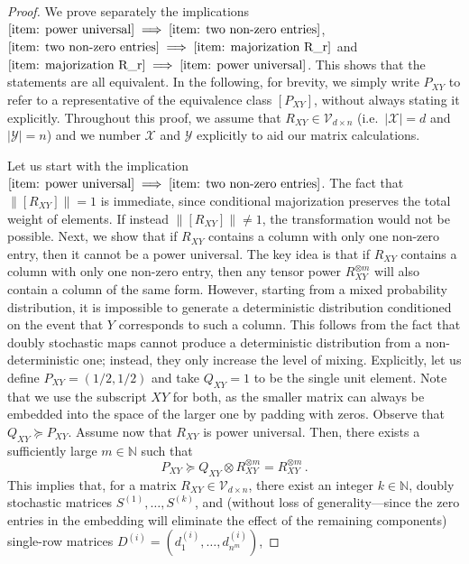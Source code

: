 \documentclass[aps,pra,11pt,onecolumn,nofootinbib,tightenlines]{revtex4-2}
\theoremstyle{definition}
\newcommand{\V}{\mathcal{V}}
\newcommand{\mc}[1]{\mathcal{#1}}
\begin{document}
\begin{proof}
We prove separately the implications $\ref{item: power universal} \implies \ref{item: two non-zero entries}$, $\ref{item: two non-zero entries} \implies \ref{item: majorization R_r}$ and $\ref{item: majorization R_r} \implies \ref{item: power universal}$. This shows that the statements are all equivalent.
In the following, for brevity, we simply write $P_{XY}$ to refer to a representative of the equivalence class $[P_{XY}]$, without always stating it explicitly. Throughout this proof, we assume that $R_{XY}\in\mc V_{d\times n}$ (i.e.\ $|\mc X|=d$ and $|\mc Y|=n$) and we number $\mc X$ and $\mc Y$ explicitly to aid our matrix calculations.

\bigskip

Let us start with the implication $\ref{item: power universal} \implies \ref{item: two non-zero entries}$. The fact that \( \|[R_{XY}]\| = 1 \) is immediate, since conditional majorization preserves the total weight of elements. If instead \( \|[R_{XY}]\| \neq 1 \), the transformation would not be possible. Next, we show that if $R_{XY}$ contains a column with only one non-zero entry, then it cannot be a power universal. The key idea is that if \( R_{XY} \) contains a column with only one non-zero entry, then any tensor power \( R_{XY}^{\otimes m} \) will also contain a column of the same form. However, starting from a mixed probability distribution, it is impossible to generate a deterministic distribution conditioned on the event that \( Y \) corresponds to such a column. This follows from the fact that doubly stochastic maps cannot produce a deterministic distribution from a non-deterministic one; instead, they only increase the level of mixing.
Explicitly, let us define \( P_{XY} = (1/2, 1/2) \) and take \( Q_{XY} = 1 \) to be the single unit element. Note that we use the subscript $XY$ for both, as the smaller matrix can always be embedded into the space of the larger one by padding with zeros.
Observe that \( Q_{XY} \succeq P_{XY} \).  Assume now that \( R_{XY} \) is power universal. Then, there exists a sufficiently large \( m \in \mathbb{N} \) such that
\begin{equation}
    P_{XY} \succeq Q_{XY} \otimes R_{XY}^{\otimes m} = R_{XY}^{\otimes m}\,.
\end{equation}
This implies that, for a matrix \( R_{XY} \in \V_{d \times n} \), there exist an integer \( k \in \mathbb{N} \), doubly stochastic matrices \( S^{(1)}, \ldots, S^{(k)}\), and (without loss of generality—since the zero entries in the embedding will eliminate the effect of the remaining components) single-row matrices \( D^{(i)} = (d^{(i)}_1, \ldots, d^{(i)}_{n^m}) \),

\end{proof}
\end{document}
